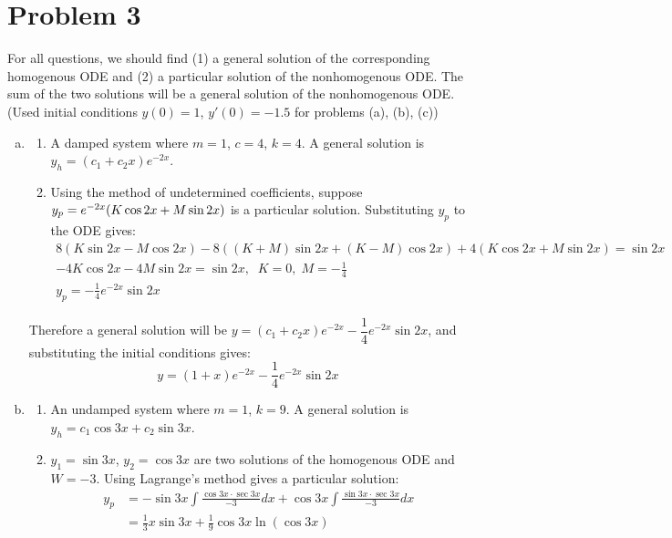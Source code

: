 \documentclass[10pt]{article}
\begin{document}
\section*{Problem 3}
For all questions, we should find (1) a general solution of the corresponding homogenous ODE and (2) a particular solution of the nonhomogenous ODE.
The sum of the two solutions will be a general solution of the nonhomogenous ODE. (Used initial conditions $y(0) = 1$, $y'(0) = -1.5$ for problems (a), (b), (c))
\begin{enumerate}[(a), leftmargin=*]
    \item \begin{enumerate}[(1), leftmargin=*]
        \item A damped system where $m = 1$, $c = 4$, $k = 4$. A general solution is $y_h = (c_1 + c_2x)e^{-2x}$.
        \item Using the method of undetermined coefficients, suppose $y_p = e^{-2x}\qty(K\cos{2x}+M\sin{2x})$ is a particular solution.
        Substituting $y_p$ to the ODE gives:
        \begin{gather*}
            8(K\sin{2x} - M\cos{2x}) - 8((K+M)\sin{2x} + (K-M)\cos{2x}) + 4(K\cos{2x} + M\sin{2x}) = \sin{2x} \\
            -4K\cos{2x}-4M\sin{2x} = \sin{2x}, \;\; K = 0, \; M = -\frac{1}{4} \\
            y_p = -\frac{1}{4}e^{-2x}\sin{2x}
        \end{gather*}
    \end{enumerate}
    Therefore a general solution will be $y = (c_1 + c_2x)e^{-2x} - \dfrac{1}{4}e^{-2x}\sin{2x}$, and substituting the initial conditions gives:
    $$y = (1 + x)e^{-2x} - \dfrac{1}{4}e^{-2x}\sin{2x}$$
    \item \begin{enumerate}[(1), leftmargin=*]
        \item An undamped system where $m = 1$, $k = 9$. A general solution is $y_h = c_1\cos{3x} + c_2\sin{3x}$.
        \item $y_1 = \sin{3x}$, $y_2 = \cos{3x}$ are two solutions of the homogenous ODE and $W = -3$. Using Lagrange's method gives a particular solution:
        \begin{align*}
            y_p &= -\sin{3x}\int{\frac{\cos{3x}\cdot\sec{3x}}{-3}}dx + \cos{3x}\int{\frac{\sin{3x}\cdot\sec{3x}}{-3}}dx \\
            &= \frac{1}{3}x\sin{3x} + \frac{1}{9}\cos{3x}\ln(\cos{3x})
        \end{align*}

\end{enumerate}
\end{enumerate}
\end{document}
